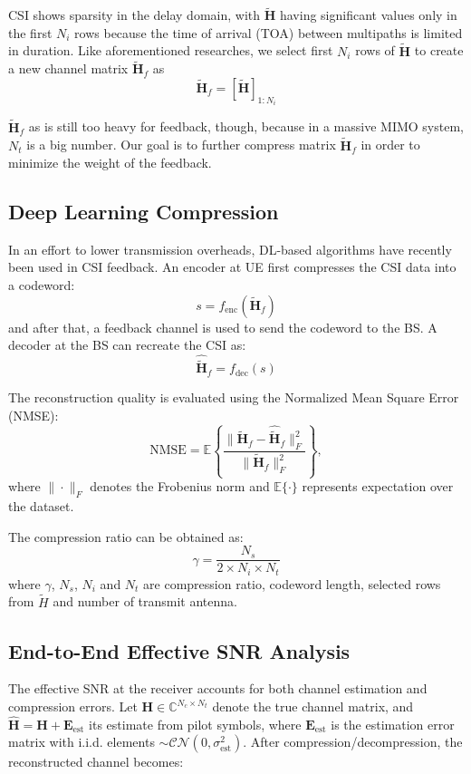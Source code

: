 \documentclass[lettersize,journal]{IEEEtran}
\begin{document}
CSI shows sparsity in the delay domain, with $\tilde{\mathbf{H}}$ having significant values only in the first $N_{i}$ rows because the time of arrival (TOA) between multipaths is limited in duration. Like aforementioned researches, we select first $N_{i}$ rows of $\tilde{\mathbf{H}}$ to create a new channel matrix $\tilde{\mathbf{H}}_f$ as
\[
\tilde{\mathbf{H}}_f = \left[ \tilde{\mathbf{H}} \right]_{1:N_{i}} 
\]

$\tilde{\mathbf{H}}_f$ as is still too heavy for feedback, though, because in a massive MIMO system, $N_{t}$ is a big number. Our goal is to further compress matrix $\tilde{\mathbf{H}}_f$ in order to minimize the weight of the feedback.

\subsection{Deep Learning Compression}
In an effort to lower transmission overheads, DL-based algorithms have recently been used in CSI feedback. An encoder at UE first compresses the CSI data into a codeword:
\[
s = f_{\text{enc}}(\tilde{\mathbf{H}}_f) 
\]
and after that, a feedback channel is used to send the codeword to the BS. A decoder at the BS can recreate the CSI as:
\[
\hat{\tilde{\mathbf{H}}}_f = f_{\text{dec}}(s) 
\]

The reconstruction quality is evaluated using the Normalized Mean Square Error (NMSE):
\[
\text{NMSE} = \mathbb{E}\left\{\frac{\|\tilde{\mathbf{H}}_f - \hat{\tilde{\mathbf{H}}}_f\|_F^2}{\|\tilde{\mathbf{H}}_f\|_F^2}\right\},
\]
where $\|\cdot\|_F$ denotes the Frobenius norm and $\mathbb{E}\{\cdot\}$ represents expectation over the dataset.

The compression ratio can be obtained as:
\[
\gamma = \frac{N_{s}}{2\times N_{i}\times N_{t}}  
\]
where $\gamma$, $N_{s}$, $N_{i}$ and $N_{t}$ are compression ratio, codeword length, selected rows from $\tilde{H}$ and number of transmit antenna.

\subsection{End-to-End Effective SNR Analysis}
The effective SNR at the receiver accounts for both channel estimation and compression errors. Let $\mathbf{H} \in \mathbb{C}^{N_c \times N_t}$ denote the true channel matrix, and $\hat{\mathbf{H}} = \mathbf{H} + \mathbf{E}_{\text{est}}$ its estimate from pilot symbols, where $\mathbf{E}_{\text{est}}$ is the estimation error matrix with i.i.d. elements $\sim \mathcal{CN}(0,\sigma_{\text{est}}^2)$. After compression/decompression, the reconstructed channel becomes:
\end{document}
